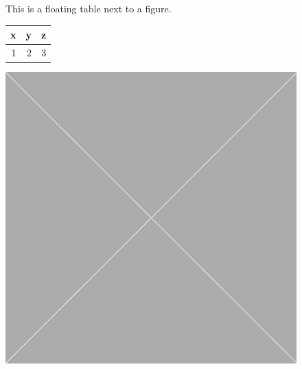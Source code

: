 \documentclass[10pt,oneside]{book}
\begin{document}
\begin{figure}
  This is a floating table next to a figure.

\flushleft
\begin{minipage}{.48\linewidth}
  \centering
  \begin{tabular}{rrr}
    \toprule
    x & y & z \\
    \midrule
    1 & 2 & 3 \\
    \bottomrule
  \end{tabular}
  \label{tab:tableexample3}
\end{minipage}
\quad
\begin{minipage}{.48\linewidth}
  \centering
  \includegraphics[width=1.0\linewidth]{Pictures/placeholder.jpg}
  \label{fig:graph1}
\end{minipage}%
\end{figure}
\end{document}
